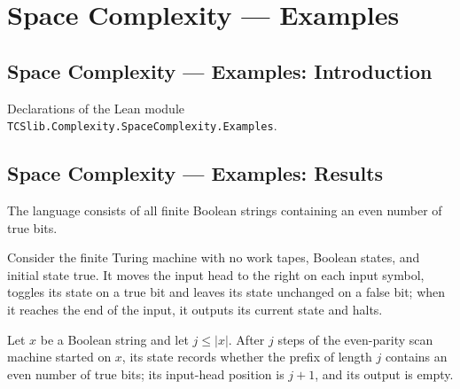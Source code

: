 \section{Space Complexity --- Examples}
\subsection*{Space Complexity --- Examples: Introduction}

Declarations of the Lean module \texttt{TCSlib.Complexity.SpaceComplexity.Examples}.

\subsection*{Space Complexity --- Examples: Results}

\begin{definition}
\label{Complexity.evenLang}
\leanok
The language consists of all finite Boolean strings containing an even number of true
bits.
\end{definition}

\begin{definition}
\label{Complexity.evenScanTM}
\leanok
{}
Consider the finite Turing machine with no work tapes, Boolean states, and initial state
true. It moves the input head to the right on each input symbol, toggles its state on a
true bit and leaves its state unchanged on a false bit; when it reaches the end of the
input, it outputs its current state and halts.
\end{definition}

\begin{theorem}
\label{Complexity.evenScanTM_prefix}
\leanok
{}
Let $x$ be a Boolean string and let $j\le |x|$. After $j$ steps of the even-parity scan
machine started on $x$, its state records whether the prefix of length $j$ contains an
even number of true bits; its input-head position is $j+1$, and its output is empty.
\end{theorem}

